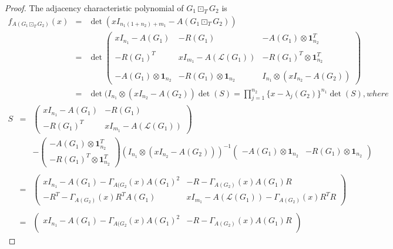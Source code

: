 \documentclass[a4paper,12pt]{article}
\begin{document}
\begin{proof}
\small
The adjacency characteristic polynomial of $G_{1} \boxdot_{T} G_{2}$ is
\begin{eqnarray*}
f_{A(G_{1} \boxdot_{T} G_{2})}(x)
&=&\det(xI_{n_{1}(1+n_{2})+m_{1}}-A(G_{1}\boxdot_{T} G_{2}))\\
&=&\det\begin{pmatrix}
xI_{n_{1}}-A(G_{1}) & -R(G_{1}) & -A(G_{1})\otimes \mathbf{1}_{n_{2}}^{T}\\\\
-R(G_{1})^{T} & xI_{m_{1}}-A(\mathcal{L}({G_{1}})) & -R(G_{1})^{T}\otimes \mathbf{1}_{n_{2}}^{T}\\\\
-A(G_{1})\otimes \mathbf{1}_{n_{2}} & -R(G_{1})\otimes \mathbf{1}_{n_{2}} & I_{n_{1}}\otimes (xI_{n_{2}}-A(G_{2}))
\end{pmatrix}\\
&=&\det(I_{n_{1}}\otimes (xI_{n_{2}}-A(G_{2}))\det(S)=\prod \limits_{j=1}^{n_{2}}\{x-\lambda_{j}(G_{2})\}^{n_{1}}\det(S), where
\end{eqnarray*}
\begin{eqnarray*}
S&=&\begin{pmatrix}
xI_{n_{1}}-A(G_{1}) & -R(G_{1}) \\
-R(G_{1})^{T} & xI_{m_{1}}-A(\mathcal{L}({G_{1}}))
\end{pmatrix}
\\&&-
\begin{pmatrix}
-A(G_{1})\otimes \mathbf{1}_{n_{2}}^{T} \\
-R(G_{1})^{T}\otimes \mathbf{1}_{n_{2}}^{T}
\end{pmatrix}
(I_{n_{1}}\otimes (xI_{n_{2}}-A(G_{2})))^{-1}
\begin{pmatrix}
-A(G_{1})\otimes \mathbf{1}_{n_{2}} & -R(G_{1})\otimes \mathbf{1}_{n_{2}}
\end{pmatrix}\\\\
&=&\begin{pmatrix}
xI_{n_{1}}-A(G_{1})-\Gamma_{A(G_{2}}(x)A(G_{1})^{2}& -R-\Gamma_{A(G_{2})}(x)A(G_{1})R \\
-R^{T}-\Gamma_{A(G_{2})}(x)R^{T}A(G_{1})& xI_{m_{1}}-A(\mathcal{L}(G_{1}))-\Gamma_{A(G_{2})}(x)R^{T}R
\end{pmatrix}\\\\
&=&\begin{pmatrix}
xI_{n_{1}}-A(G_{1})-\Gamma_{A(G_{2}}(x)A(G_{1})^{2}& -R-\Gamma_{A(G_{2})}(x)A(G_{1})R \\

\end{pmatrix}
\end{eqnarray*}
\end{proof}
\end{document}
